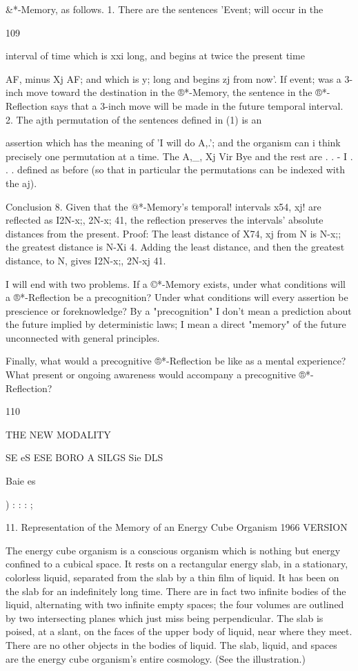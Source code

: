 \documentclass[10pt,twoside]{memoir}
\begin{document}
\begin{enumerate}
{{{{{{{{{{{{{{{{&*-Memory, as follows. 1. There are the sentences 'Event; will occur in the 


109 


interval of time which is xxi long, and begins at twice the present time 


AF, minus Xj AF; and which is y; long and begins zj from now'. If event; was 
a 3-inch move toward the destination in the ®*-Memory, the sentence in the 
®*-Reflection says that a 3-inch move will be made in the future temporal 
interval. 2. The ajth permutation of the sentences defined in (1) is an 


assertion which has the meaning of 'I will do A,.'; and the organism can 
i 
think precisely one permutation at a time. The A,_, Xj Vir Bye and the rest are 
. . - I . . . 
defined as before (so that in particular the permutations can be indexed with 
the aj). 

Conclusion 8. Given that the @*-Memory's temporal! intervals x54, xj! 
are reflected as I2N-x;, 2N-x; 41, the reflection preserves the intervals' 
absolute distances from the present. Proof: The least distance of X74, xj 
from N is N-x;; the greatest distance is N-Xi 4. Adding the least distance, and 
then the greatest distance, to N, gives I2N-x;, 2N-xj 41. 

I will end with two problems. If a ©*-Memory exists, under what 
conditions will a ®*-Reflection be a precognition? Under what conditions 
will every assertion be prescience or foreknowledge? By a "precognition" I 
don't mean a prediction about the future implied by deterministic laws; I 
mean a direct "memory" of the future unconnected with general principles. 

Finally, what would a precognitive ®*-Reflection be like as a mental 
experience? What present or ongoing awareness would accompany a 
precognitive ®*-Reflection? 


110 


THE NEW MODALITY 


SE eS 
ESE BORO A SILGS 
Sie DLS 

Baie es 


) 
: 
: 
: 
; 


11. Representation of the Memory of an Energy Cube Organism 
1966 VERSION 


The energy cube organism is a conscious organism which is nothing but 
energy confined to a cubical space. It rests on a rectangular energy slab, in a 
stationary, colorless liquid, separated from the slab by a thin film of liquid. 
It has been on the slab for an indefinitely long time. There are in fact two 
infinite bodies of the liquid, alternating with two infinite empty spaces; the 
four volumes are outlined by two intersecting planes which just miss being 
perpendicular. The slab is poised, at a slant, on the faces of the upper body 
of liquid, near where they meet. There are no other objects in the bodies of 
liquid. The slab, liquid, and spaces are the energy cube organism's entire 
cosmology. (See the illustration.) 


}}}}}}}}}}}}}}}}
\end{enumerate}
\end{document}
